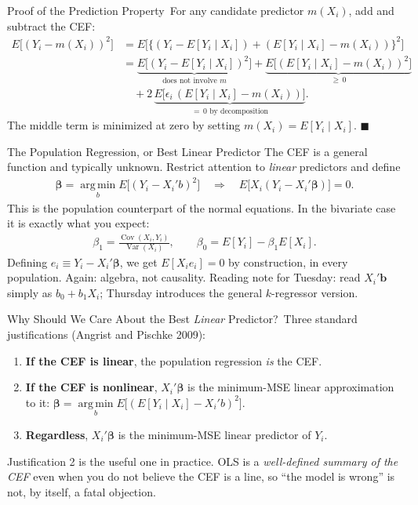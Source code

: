 \documentclass[aspectratio=169,11pt,xcolor=dvipsnames]{beamer}
\newcommand{\srcp}[1]{{\scriptsize\color{gray}(#1)}}   %
\DeclareMathOperator*{\argminop}{arg\,min}
\newcommand{\argmin}{\argminop\limits}
\DeclareMathOperator{\Cov}{Cov}
\DeclareMathOperator{\Var}{Var}
\newcommand{\E}{E}
\newcommand{\adv}{\,\raisebox{0.6pt}{\textcolor{accent}{$\bigstar$}}}
\newcommand{\core}{\,\raisebox{0.6pt}{\textcolor{corestar}{$\bigstar$}}}
\begin{document}
\begin{frame}{Proof of the Prediction Property\adv}
For any candidate predictor $m(X_i)$, add and subtract the CEF:
\begin{align*}
  \E\big[(Y_i - m(X_i))^2\big]
  &= \E\Big[\big\{ (Y_i - \E[Y_i\mid X_i]) + (\E[Y_i\mid X_i] - m(X_i)) \big\}^2\Big]\\[2pt]
  &= \underbrace{\E\big[(Y_i-\E[Y_i\mid X_i])^2\big]}_{\text{does not involve } m}
   + \underbrace{\E\big[(\E[Y_i\mid X_i] - m(X_i))^2\big]}_{\geq\, 0}\\
  &\quad + 2\,\underbrace{\E\big[\epsilon_i\,(\E[Y_i\mid X_i]-m(X_i))\big]}_{=\,0
    \text{ by decomposition}} .
\end{align*}
The middle term is minimized at zero by setting $m(X_i)=\E[Y_i\mid X_i]$.
$\blacksquare$
\end{frame}

\begin{frame}{The Population Regression, or Best Linear Predictor}
The CEF is a general function and typically unknown. Restrict attention to
\emph{linear} predictors and define
\begin{align*}
  \bm\beta = \argmin_{b} \E\big[(Y_i - X_i'b)^2\big]
  \quad\Longrightarrow\quad
  \E\big[X_i(Y_i - X_i'\bm\beta)\big] = 0 .
\end{align*}
This is the population counterpart of the normal equations. In the bivariate case
it is exactly what you expect:
\begin{align*}
  \beta_1 = \frac{\Cov(X_i, Y_i)}{\Var(X_i)},
  \qquad
  \beta_0 = \E[Y_i] - \beta_1 \E[X_i] .
\end{align*}
\vskip4pt
Defining $e_i \equiv Y_i - X_i'\bm\beta$, we get $\E[X_ie_i]=0$
\alert{by construction}, in every population. Again: algebra, not causality.
\vskip2pt
{\footnotesize Reading note for Tuesday: read $X_i'\bm b$ simply as
$b_0 + b_1 X_i$; Thursday introduces the general $k$-regressor version.}
\end{frame}

\begin{frame}{Why Should We Care About the Best \emph{Linear} Predictor?\core}
Three standard justifications \srcp{Angrist and Pischke 2009}:
\begin{enumerate}\itemsep6pt
  \item \textbf{If the CEF is linear}, the population regression \emph{is} the CEF.
  \item \textbf{If the CEF is nonlinear}, $X_i'\bm\beta$ is the minimum-MSE linear
        approximation to it:
        $\bm\beta = \argmin_b \E\big[(\E[Y_i\mid X_i] - X_i'b)^2\big]$.
  \item \textbf{Regardless}, $X_i'\bm\beta$ is the minimum-MSE linear predictor
        of $Y_i$.
\end{enumerate}
\vskip6pt
\pause
Justification 2 is the useful one in practice. OLS is a \emph{well-defined
summary of the CEF} even when you do not believe the CEF is a line, so
``the model is wrong'' is not, by itself, a fatal objection.
\end{frame}
\end{document}
